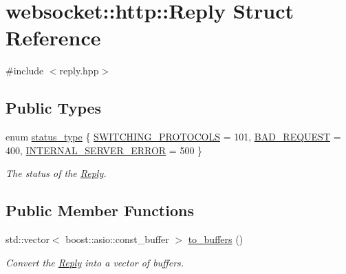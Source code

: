 \hypertarget{structwebsocket_1_1http_1_1Reply}{}\section{websocket\+:\+:http\+:\+:Reply Struct Reference}
\label{structwebsocket_1_1http_1_1Reply}


{\ttfamily \#include $<$reply.\+hpp$>$}

\subsection*{Public Types}
\begin{DoxyCompactItemize}
\item 
enum \hyperlink{structwebsocket_1_1http_1_1Reply_ab5757d7340f55ea26952d8a4b26ecff2}{status\+\_\+type} \{ \hyperlink{structwebsocket_1_1http_1_1Reply_ab5757d7340f55ea26952d8a4b26ecff2ac40eab39089a623f51ec73b0cf56debd}{S\+W\+I\+T\+C\+H\+I\+N\+G\+\_\+\+P\+R\+O\+T\+O\+C\+O\+LS} = 101, 
\hyperlink{structwebsocket_1_1http_1_1Reply_ab5757d7340f55ea26952d8a4b26ecff2abe7be227057261b88798008ac000a50c}{B\+A\+D\+\_\+\+R\+E\+Q\+U\+E\+ST} = 400, 
\hyperlink{structwebsocket_1_1http_1_1Reply_ab5757d7340f55ea26952d8a4b26ecff2acf5dc4f995928bbd6bd1eb5b599865a0}{I\+N\+T\+E\+R\+N\+A\+L\+\_\+\+S\+E\+R\+V\+E\+R\+\_\+\+E\+R\+R\+OR} = 500
 \}\begin{DoxyCompactList}\small\item\em The status of the \hyperlink{structwebsocket_1_1http_1_1Reply}{Reply}. \end{DoxyCompactList}
\end{DoxyCompactItemize}
\subsection*{Public Member Functions}
\begin{DoxyCompactItemize}
\item 
std\+::vector$<$ boost\+::asio\+::const\+\_\+buffer $>$ \hyperlink{structwebsocket_1_1http_1_1Reply_a69b864b3b73877e32794cff8df944485}{to\+\_\+buffers} ()
\begin{DoxyCompactList}\small\item\em Convert the \hyperlink{structwebsocket_1_1http_1_1Reply}{Reply} into a vector of buffers. \end{DoxyCompactList}\end{DoxyCompactItemize}
